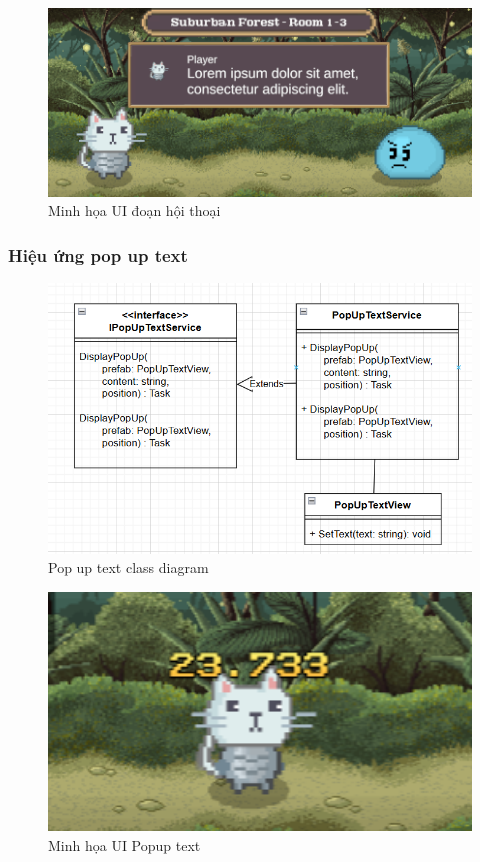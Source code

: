 \begin{figure}[H]
	\centering
	\includegraphics[width=13cm]{Images/DialogueUI.png}
	\vspace{0.5cm}
	\caption{Minh họa UI đoạn hội thoại}
\end{figure}

\subsubsection{Hiệu ứng pop up text}
\begin{figure}[H]
	\centering
	\includegraphics[width=13cm]{Images/PopUpText.png}
	\vspace{0.5cm}
	\caption{Pop up text class diagram}
\end{figure}

\begin{figure}[H]
	\centering
	\includegraphics[width=13cm]{Images/PopupTextUI.png}
	\vspace{0.5cm}
	\caption{Minh họa UI Popup text}
\end{figure}

